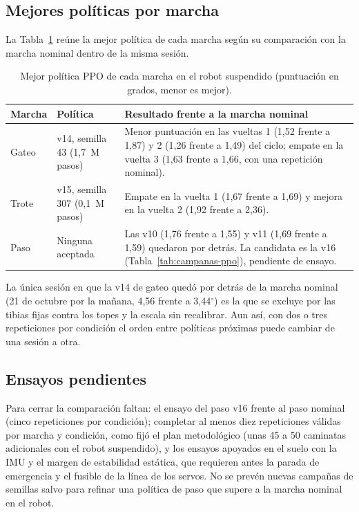 \subsection{Mejores políticas por marcha}

La Tabla~\ref{tab:mejores-politicas} reúne la mejor política de cada marcha
según su comparación con la marcha nominal dentro de la misma sesión.

\begin{table}[H]
\centering
\small
\caption{Mejor política PPO de cada marcha en el robot suspendido (puntuación en grados, menor es mejor).}
\label{tab:mejores-politicas}
\begin{tabular}{>{\raggedright\arraybackslash}p{}>{\raggedright\arraybackslash}p{}>{\raggedright\arraybackslash}p{}}
\toprule
Marcha & Política & Resultado frente a la marcha nominal \\
\midrule
Gateo & v14, semilla 43 (1,7~M pasos) & Menor puntuación en las vueltas 1 (1,52 frente a 1,87) y 2 (1,26 frente a 1,49) del ciclo; empate en la vuelta 3 (1,63 frente a 1,66, con una repetición nominal). \\
Trote & v15, semilla 307 (0,1~M pasos) & Empate en la vuelta 1 (1,67 frente a 1,69) y mejora en la vuelta 2 (1,92 frente a 2,36). \\
Paso & Ninguna aceptada & Las v10 (1,76 frente a 1,55) y v11 (1,69 frente a 1,59) quedaron por detrás. La candidata es la v16 (Tabla~\ref{tab:campanas-ppo}), pendiente de ensayo. \\
\bottomrule
\end{tabular}
\end{table}

La única sesión en que la v14 de gateo quedó por detrás de la marcha nominal
(21 de octubre por la mañana, 4,56 frente a 3,44$^\circ$) es la que se excluye
por las tibias fijas contra los topes y la escala sin recalibrar. Aun así, con
dos o tres repeticiones por condición el orden entre políticas próximas puede
cambiar de una sesión a otra.

\subsection{Ensayos pendientes}

Para cerrar la comparación faltan: el ensayo del paso v16 frente al paso
nominal (cinco repeticiones por condición); completar al menos diez
repeticiones válidas por marcha y condición, como fijó el plan metodológico
(unas 45 a 50 caminatas adicionales con el robot suspendido), y los ensayos
apoyados en el suelo con la IMU y el margen de estabilidad estática, que
requieren antes la parada de emergencia y el fusible de la línea de los servos.
No se prevén nuevas campañas de semillas salvo para refinar una política de
paso que supere a la marcha nominal en el robot.

